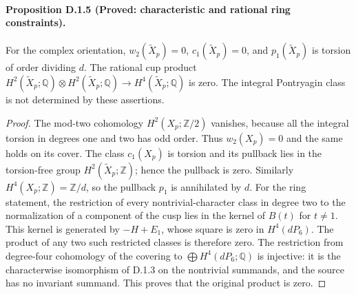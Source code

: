 \paragraph{Proposition D.1.5 (Proved: characteristic and rational ring constraints).}
For the complex orientation, $w_2(\widetilde X_p)=0$,
$c_1(\widetilde X_p)=0$, and $p_1(\widetilde X_p)$ is torsion of
order dividing $d$. The rational cup product
$H^2(\widetilde X_p;\mathbb Q)\otimes H^2(\widetilde X_p;\mathbb Q)
\to H^4(\widetilde X_p;\mathbb Q)$ is zero. The integral Pontryagin
class is not determined by these assertions.
\begin{proof}
The mod-two cohomology $H^2(X_p;\mathbb Z/2)$ vanishes, because all
the integral torsion in degrees one and two has odd order. Thus
$w_2(X_p)=0$ and the same holds on its cover. The class $c_1(X_p)$
is torsion and its pullback lies in the torsion-free group
$H^2(\widetilde X_p;\mathbb Z)$; hence the pullback is zero.
Similarly $H^4(X_p;\mathbb Z)=\mathbb Z/d$, so the pullback $p_1$
is annihilated by $d$.
For the ring statement, the restriction of every nontrivial-character
class in degree two to the normalization of a component of the cusp
lies in the kernel of $B(t)$ for $t\ne1$. This kernel is generated
by $-H+E_1$, whose square is zero in $H^4(dP_6)$.
The product of any two such restricted classes is therefore zero.
The restriction from degree-four cohomology of the covering to
$\bigoplus H^4(dP_6;\mathbb Q)$ is injective: it is the characterwise
isomorphism of D.1.3 on the nontrivial summands, and the source has
no invariant summand. This proves that the original product is zero.
\end{proof}


